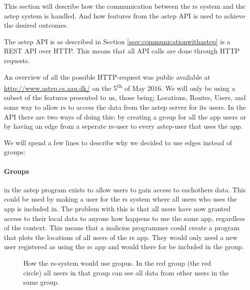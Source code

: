 This section will describe how the communication between the \gls{rs} system and the \gls{astep} system is handled.
And how features from the \gls{astep} API is used to achieve the desired outcomes.

The \gls{astep} API is as described in Section \ref{ssec:communicationwithastep} is a REST API over HTTP. 
This means that all API calls are done through HTTP requests.

An overview of all the possible HTTP-request was public available at \url{http://www.astep.cs.aau.dk/} on the 5\textsuperscript{th} of May 2016.
We will only be using a subset of the features presented to us, those being; Locations, Routes, Users, and some way to allow \gls{rs} to access the data from the \gls{astep} server for its users.
In the API there are two ways of doing this; by creating a group for all the app users or by having an edge from a seperate \gls{rs}-user to every \gls{astep}-user that uses the app.

We will spend a few lines to describe why we decided to use edges instead of groups:

\paragraph{Groups} in the \gls{astep} program exists to allow users to gain access to eachothers data.
This could be used by making a user for the \gls{rs} system where all users who uses the app is included in.
The problem with this is that all users have now granted access to their local data to anyone how happens to use the same app, regardless of the context. 
This means that a malicios programmer could create a program that plots the locations of all users of the \gls{rs} app.
They would only need a new user registered as using the \gls{rs} app and would there for be included in the group.

\begin{figure}[h]
	\centering
	\label{fig:astepgroup}
	\caption{How the \gls{rs}-system would use gropus. In the red group (the red circle) all users in that group can see all data from other users in the same group.}
\end{figure}

